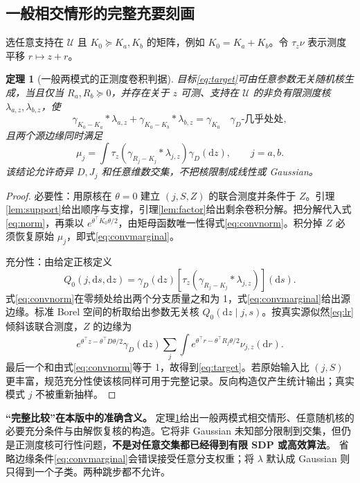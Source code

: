 \documentclass[UTF8,fontset=fandol,zihao=5,a4paper]{ctexart}
\newcommand{\dd}{\mathrm d}\newcommand{\given}{\,|\,}
\newtheorem{theorem}{定理}[section]
\theoremstyle{definition}
\theoremstyle{remark}\newtheorem{remark}[theorem]{说明}
\numberwithin{equation}{section}
\begin{document}
\subsection{一般相交情形的完整充要刻画}
选任意支持在 $\mathcal U$ 且 $K_0\succeq K_a,K_b$ 的矩阵，例如 $K_0=K_a+K_b$。令 $\tau_z\nu$ 表示测度平移 $r\mapsto z+r$。

\begin{theorem}[一般两模式的正测度卷积判据]
\label{thm:general}
目标\eqref{eq:target}可由任意参数无关随机核生成，当且仅当 $R_a,R_b\succeq0$，并存在关于 $z$ 可测、支持在 $\mathcal U$ 的非负有限测度核 $\lambda_{a,z},\lambda_{b,z}$，使
\begin{equation}
\boxed{
\gamma_{K_0-K_a}*\lambda_{a,z}
+\gamma_{K_0-K_b}*\lambda_{b,z}
=\gamma_{K_0}
\quad\gamma_D\text{-几乎处处},}
\label{eq:convnorm}
\end{equation}
且两个源边缘同时满足
\begin{equation}
\boxed{
\mu_j=\int\tau_z\!\left(\gamma_{R_j-K_j}*\lambda_{j,z}\right)
\gamma_D(\dd z),\qquad j=a,b.}
\label{eq:convmarginal}
\end{equation}
该结论允许奇异 $D,J_j$ 和任意维数交集，不把核限制成线性或 Gaussian。
\end{theorem}
\begin{proof}
必要性：用原核在 $\theta=0$ 建立 $(j,S,Z)$ 的联合测度并条件于 $Z$。引理\ref{lem:support}给出顺序与支撑，引理\ref{lem:factor}给出剩余卷积分解。把分解代入式\eqref{eq:norm}，再乘以 $e^{\theta^\top K_0\theta/2}$，由矩母函数唯一性得式\eqref{eq:convnorm}。积分掉 $Z$ 必须恢复原始 $\mu_j$，即式\eqref{eq:convmarginal}。

充分性：由给定正核定义
\[
Q_0(j,\dd s,\dd z)=\gamma_D(\dd z)
\left[\tau_z(\gamma_{R_j-K_j}*\lambda_{j,z})\right](\dd s).
\]
式\eqref{eq:convnorm}在零频处给出两个分支质量之和为 1，式\eqref{eq:convmarginal}给出源边缘。标准 Borel 空间的析取给出参数无关核 $Q_0(\dd z\mid j,s)$。按真实源似然\eqref{eq:lr}倾斜该联合测度，$Z$ 的边缘为
\[
e^{\theta^\top z-\theta^\top D\theta/2}\gamma_D(\dd z)
\sum_j\int e^{\theta^\top r-\theta^\top R_j\theta/2}\nu_{j,z}(\dd r).
\]
最后一个和由式\eqref{eq:convnorm}等于 1，故得到\eqref{eq:target}。若原始输入比 $(j,S)$ 更丰富，规范充分性使该核同样可用于完整记录。反向构造仅产生统计输出；真实模式 $j$ 不被重新抽样。
\end{proof}

\begin{keybox}
\textbf{“完整比较”在本版中的准确含义。}
定理\ref{thm:general}给出一般两模式相交情形、任意随机核的必要充分条件与由解恢复核的构造。它将非 Gaussian 未知部分限制到交集，但仍是正测度核可行性问题，\textbf{不是对任意交集都已经得到有限 SDP 或高效算法}。
省略边缘条件\eqref{eq:convmarginal}会错误接受任意分支权重；将 $\lambda$ 默认成 Gaussian 则只得到一个子类。两种跳步都不允许。
\end{keybox}
\end{document}
